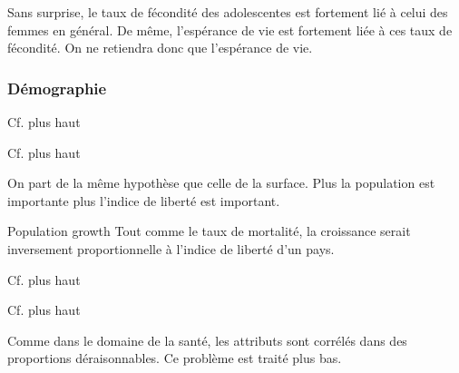 Sans surprise, le taux de fécondité des adolescentes est fortement lié à celui des femmes en général. De même, l'espérance de vie est fortement liée à ces taux de fécondité. On ne retiendra donc que l'espérance de vie.

\subsubsection{Démographie} 
\begin{description}
\item [Fertility rate]
Cf. plus haut
\item [Adolescent fertility]
Cf. plus haut
\item [Population totale]
On part de la même hypothèse que celle de la surface. Plus la population est importante plus l'indice de liberté est important.
\item Population growth
Tout comme le taux de mortalité, la croissance serait inversement proportionnelle à l'indice de liberté d'un pays.
\item [Life expectancy]
Cf. plus haut
\item [Surface]
Cf. plus haut
\end{description}

Comme dans le domaine de la santé, les attributs sont corrélés dans des proportions déraisonnables. Ce problème est traité plus bas.

